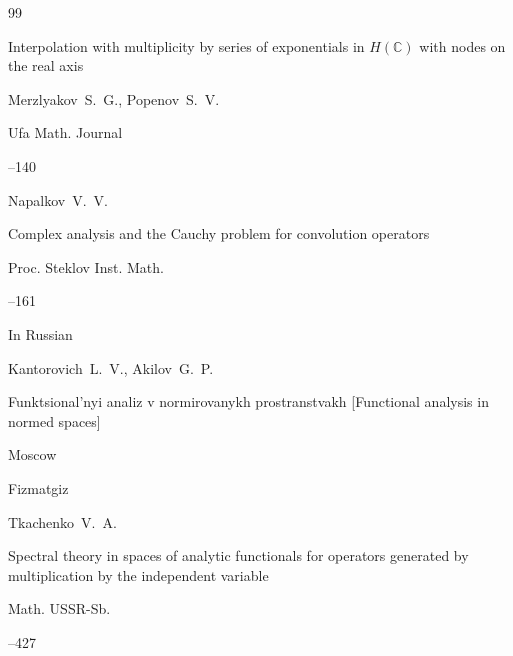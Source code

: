 \begin{thebibliography}{99}

\paper Interpolation with multiplicity by series of exponentials in $H(\mathbb{C})$ with nodes on the real axis

\by Merzlyakov~S.~G., Popenov~S.~V.

\jour Ufa Math. Journal




--140





\by Napalkov~V.~V.

\paper Complex analysis and the Cauchy problem for convolution operators

\jour Proc. Steklov Inst. Math.



--161




\lang In Russian

\by Kantorovich~L.~V., Akilov~G.~P.

\book Funktsional'nyi analiz v normirovanykh prostranstvakh \rm [Functional analysis in normed spaces]

\publaddr Moscow

\publ Fizmatgiz








\by Tkachenko~V.~A.

\paper Spectral theory in spaces of analytic functionals for operators generated by multiplication by the independent variable

\jour Math. USSR-Sb.




--427






\end{thebibliography}

